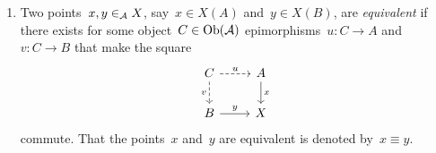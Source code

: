 \begin{remarkdefinition}[continues=abstract points]
  \leavevmode
  \begin{enumerate}[start=3]
    \item
      Two points~$x, y \in_{\mathcal{A}} X$, say~$x \in X(A)$ and~$y \in X(B)$, are \emph{equivalent} if there exists for some object~$C \in \operatorname{Ob}(\mathcal{A})$ epimorphisms~$u \colon C \to A$ and~$v \colon C \to B$ that make the square
      \[
        \begin{tikzcd}
            C
            \arrow[dashed]{r}[above]{u}
            \arrow[dashed]{d}[left]{v}
          & A
            \arrow{d}[right]{x}
          \\
            B
            \arrow{r}[above]{y}
          & X
        \end{tikzcd}
      \]
      commute.
      That the points~$x$ and~$y$ are equivalent is denoted by~$x \equiv y$.
      

\end{enumerate}
\end{remarkdefinition}
